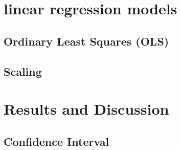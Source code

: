 \documentclass[twoside,11pt]{report}
\begin{document}














\section{linear regression models }
\label{sec:models}






\subsection{Ordinary Least Squares (OLS)}
\label{sec:ols}


\subsection{Scaling}
\label{sec:scaling}









\section{Results and Discussion}
\label{sec:resultsdiscussion}



\subsection{Confidence Interval}
\label{sec:confidenceinterval}
\end{document}
